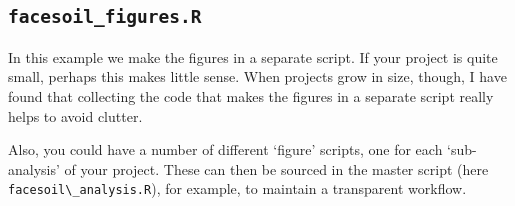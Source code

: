 \documentclass[]{book}
\newenvironment{Shaded}{\begin{snugshade}}{\end{snugshade}}
\newcommand{\CommentTok}[1]{\textcolor[rgb]{0.56,0.35,0.01}{\textit{#1}}}
\newcommand{\DataTypeTok}[1]{\textcolor[rgb]{0.13,0.29,0.53}{#1}}
\newcommand{\KeywordTok}[1]{\textcolor[rgb]{0.13,0.29,0.53}{\textbf{#1}}}
\newcommand{\NormalTok}[1]{#1}
\newcommand{\OperatorTok}[1]{\textcolor[rgb]{0.81,0.36,0.00}{\textbf{#1}}}
\newcommand{\OtherTok}[1]{\textcolor[rgb]{0.56,0.35,0.01}{#1}}
\newcommand{\StringTok}[1]{\textcolor[rgb]{0.31,0.60,0.02}{#1}}
\begin{document}
\begin{Shaded}
\end{Shaded}

\hypertarget{facesoil_figures.r}{%
\subsection{\texorpdfstring{\texttt{facesoil\_figures.R}}{facesoil\_figures.R}}\label{facesoil_figures.r}}

In this example we make the figures in a separate script. If your project is quite small, perhaps this makes little sense. When projects grow in size, though, I have found that collecting the code that makes the figures in a separate script really helps to avoid clutter.

Also, you could have a number of different `figure' scripts, one for each `sub-analysis' of your project. These can then be sourced in the master script (here \texttt{facesoil\textbackslash{}\_analysis.R}), for example, to maintain a transparent workflow.
\end{document}
